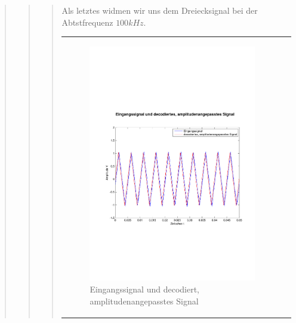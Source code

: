 \begin{quote}
\begin{quote}
\begin{quote}
            
            \vspace{1em}
            
            Als letztes widmen wir uns dem Dreiecksignal bei der Abtstfrequenz $100 kHz$.

            \begin{center}
                \begin{tabular}{ll}
                
                \hspace{-4cm}
                    \begin{minipage}{0.6\textwidth}
                        \begin{figure}[H]
                            \includegraphics[scale=0.4, trim = 0cm 7cm 0cm
                            7.5cm, clip]
                            {./Bilder/drei100_Eingang_vs_DecodiertAmpl-angepasst}
                              \caption{Eingangssignal und decodiert, \newline
                              amplitudenangepasstes Signal}
                        \end{figure}
                    \end{minipage}
                    

\end{tabular}
\end{center}
\end{quote}
\end{quote}
\end{quote}
